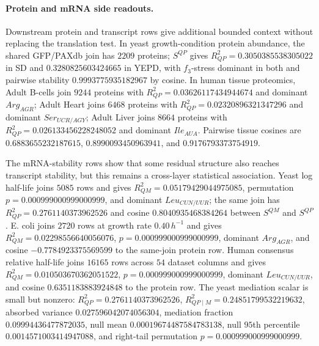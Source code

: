 \paragraph{Protein and mRNA side readouts.}
Downstream protein and transcript rows give additional bounded context without replacing the translation test.  In yeast growth-condition protein abundance, the shared GFP/PAXdb join has $2209$ proteins; $S^{QP}$ gives $R^2_{QP}=0.3050385538305022$ in SD and $0.3280825603424665$ in YEPD, with $f_3$-stress dominant in both and pairwise stability $0.9993775935182967$ by cosine.  In human tissue proteomics, Adult B-cells join $9244$ proteins with $R^2_{QP}=0.03626117434944674$ and dominant $Arg_{AGR}$; Adult Heart joins $6468$ proteins with $R^2_{QP}=0.02320896321347296$ and dominant $Ser_{UCR/AGY}$; Adult Liver joins $8664$ proteins with $R^2_{QP}=0.026133456228248052$ and dominant $Ile_{AUA}$.  Pairwise tissue cosines are $0.6883655232187615$, $0.8990093450963941$, and $0.9176793373754919$.

The mRNA-stability rows show that some residual structure also reaches transcript stability, but this remains a cross-layer statistical association.  Yeast log half-life joins $5085$ rows and gives $R^2_{QM}=0.05179429044975085$, permutation $p=0.000999000999000999$, and dominant $Leu_{CUN/UUR}$; the same join has $R^2_{QP}=0.2761140373962526$ and cosine $0.8040935468384264$ between $S^{QM}$ and $S^{QP}$.  E. coli joins $2720$ rows at growth rate $0.40\,h^{-1}$ and gives $R^2_{QM}=0.02298556640056076$, $p=0.000999000999000999$, dominant $Arg_{AGR}$, and cosine $-0.7784923375569599$ to the same-join protein row.  Human consensus relative half-life joins $16165$ rows across $54$ dataset columns and gives $R^2_{QM}=0.010503670362051522$, $p=0.000999000999000999$, dominant $Leu_{CUN/UUR}$, and cosine $0.6351183883924848$ to the protein row.  The yeast mediation scalar is small but nonzero: $R^2_{QP}=0.2761140373962526$, $R^2_{QP\mid M}=0.24851799532219632$, absorbed variance $0.027596042074056304$, mediation fraction $0.09994436477872035$, null mean $0.00019674487584783138$, null $95$th percentile $0.0014571003414947088$, and right-tail permutation $p=0.000999000999000999$.

